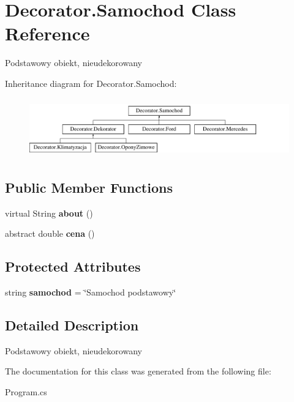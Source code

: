 \hypertarget{class_decorator_1_1_samochod}{}\section{Decorator.\+Samochod Class Reference}
\label{class_decorator_1_1_samochod}


Podstawowy obiekt, nieudekorowany  


Inheritance diagram for Decorator.\+Samochod\+:\begin{figure}[H]
\begin{center}
\leavevmode
\includegraphics[height=2.576687cm]{class_decorator_1_1_samochod}
\end{center}
\end{figure}
\subsection*{Public Member Functions}
\begin{DoxyCompactItemize}
\item 
\mbox{\label{class_decorator_1_1_samochod_a48c5591c5ee338bfe4c1c5c7d26fde8d}} 
virtual String {\bfseries about} ()
\item 
\mbox{\label{class_decorator_1_1_samochod_a1e2150121674454a06f3f6ec7092d134}} 
abstract double {\bfseries cena} ()
\end{DoxyCompactItemize}
\subsection*{Protected Attributes}
\begin{DoxyCompactItemize}
\item 
\mbox{\label{class_decorator_1_1_samochod_a4493a233669270a561f60916f52f7f2e}} 
string {\bfseries samochod} = \char`\"{}Samochod podstawowy\char`\"{}
\end{DoxyCompactItemize}


\subsection{Detailed Description}
Podstawowy obiekt, nieudekorowany 



The documentation for this class was generated from the following file\+:\begin{DoxyCompactItemize}
\item 
Program.\+cs\end{DoxyCompactItemize}
